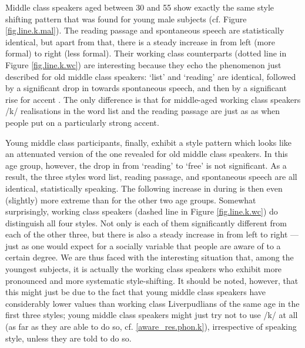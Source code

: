 Middle class speakers aged between 30 and 55 show exactly the same style shifting pattern that was found for young male subjects (cf. Figure \ref{fig.line.k.mal}).
The reading passage and spontaneous speech are statistically identical, but apart from that, there is a steady increase in  from left (more formal) to right (less formal).
Their working class counterparts (dotted line in Figure \ref{fig.line.k.wc}) are interesting because they echo the phenomenon just described for old middle class speakers: `list' and `reading' are identical, followed by a significant drop in  towards spontaneous speech, and then by a significant rise for accent .
The only difference is that for middle-aged working class speakers /k/ realisations in the word list and the reading passage are just as  as when people put on a particularly strong  accent.

Young middle class participants, finally, exhibit a style pattern which looks like an attenuated version of the one revealed for old middle class speakers.
In this age group, however, the drop in  from `reading' to `free' is not significant.
As a result, the three styles word list, reading passage, and spontaneous speech are all identical, statistically speaking.
The following increase in  during  is then even (slightly) more extreme than for the other two age groups.
Somewhat surprisingly, working class speakers (dashed line in Figure \ref{fig.line.k.wc}) do distinguish all four styles.
Not only is each of them significantly different from each of the other three, but there is also a steady increase in  from left to right --- just as one would expect for a socially  variable that people are aware of to a certain degree.
We are thus faced with the interesting situation that, among the youngest subjects, it is actually the working class speakers who exhibit more pronounced and more systematic style-shifting.
It should be noted, however, that this might just be due to the fact that young middle class speakers have considerably lower  values than working class Liverpudlians of the same age in the first three styles; young middle class speakers might just try not to use /k/  at all (as far as they are able to do so, cf. \ref{aware_res.phon.k}), irrespective of speaking style, unless they are told to do so.